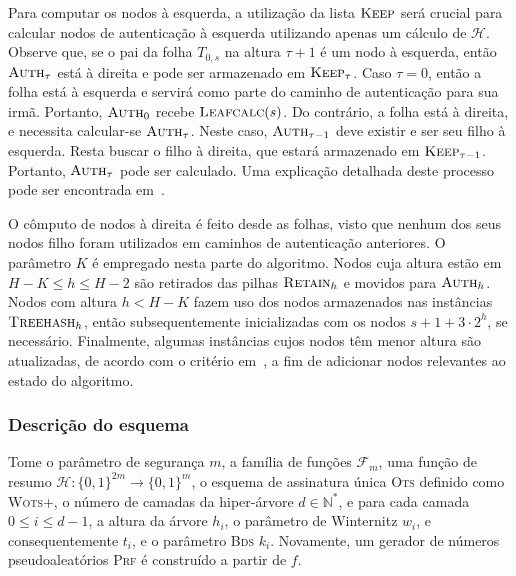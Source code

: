 \documentclass{ufsctex/ufsctex}
\newcommand{\hh}{\mathcal{H}}
\newcommand{\binwds}[1]{\{0, 1\}^{#1}}
\newcommand{\bds}{\textsc{Bds}}
\newcommand{\wotsplus}{\textsc{Wots+}}
\begin{document}
Para computar os nodos à esquerda, a utilização da lista $\textsc{Keep}$ será
crucial para calcular nodos de autenticação à esquerda utilizando apenas um
cálculo de $\hh{}$. Observe que, se o pai da folha $T_{0, s}$ na altura $\tau +
1$ é um nodo à esquerda, então $\textsc{Auth}_{\tau}$ está à direita e pode ser
armazenado em $\textsc{Keep}_{\tau}$. Caso $\tau = 0$, então a folha está à
esquerda e servirá como parte do caminho de autenticação para sua irmã.
Portanto, $\textsc{Auth}_{0}$ recebe $\textsc{Leafcalc}(s)$. Do contrário, a
folha está à direita, e necessita calcular-se $\textsc{Auth}_{\tau}$. Neste
caso, $\textsc{Auth}_{\tau - 1}$ deve existir e ser seu filho à esquerda. Resta
buscar o filho à direita, que estará armazenado em $\textsc{Keep}_{\tau - 1}$.
Portanto, $\textsc{Auth}_{\tau}$ pode ser calculado. Uma explicação detalhada
deste processo pode ser encontrada em~\cite[Seção
2.1]{Buchmann:inproc:2008:oct}.

O cômputo de nodos à direita é feito desde as folhas, visto que nenhum dos seus
nodos filho foram utilizados em caminhos de autenticação anteriores. O
parâmetro $K$ é empregado nesta parte do algoritmo. Nodos cuja altura estão em
$H - K \leq h \leq H - 2$ são retirados das pilhas $\textsc{Retain}_{h}$ e
movidos para $\textsc{Auth}_h$. Nodos com altura $h < H - K$ fazem uso dos
nodos armazenados nas instâncias $\textsc{Treehash}_{h}$, então
subsequentemente inicializadas com os nodos $s + 1 + 3 \cdot 2^h$, se
necessário. Finalmente, algumas instâncias cujos nodos têm menor altura são
atualizadas, de acordo com o critério em~\cite[Seção 4.5]{Bernstein:book:2008},
a fim de adicionar nodos relevantes ao estado do algoritmo.

\subsubsection{Descrição do esquema}\label{subsubsection:xmssmt}

Tome o parâmetro de segurança $m$, a família de funções $\mathcal{F}_m$, uma
função de resumo $\hh{} : \binwds{2m} \longrightarrow \binwds{m}$, o esquema de
assinatura única \textsc{Ots} definido como \wotsplus{}, o número de camadas da
hiper-árvore $d \in \mathbb{N}^{*}$, e para cada camada $0 \leq i \leq d - 1$,
a altura da árvore $h_i$, o parâmetro de Winternitz $w_i$, e consequentemente
$t_i$, e o parâmetro \bds{} $k_i$. Novamente, um gerador de números
pseudoaleatórios \textsc{Prf} é construído a partir de $f$.
\end{document}
